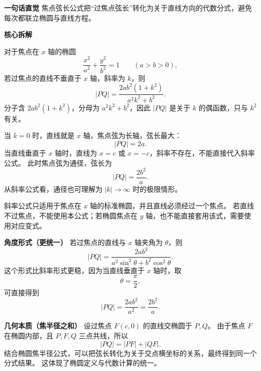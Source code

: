 \begin{explanationbox}
	\textbf{\textcolor{CExplanation}{一句话直觉}}
	焦点弦长公式把“过焦点弦长”转化为关于直线方向的代数分式，避免每次都联立椭圆与直线方程。

	\medskip

	\textbf{\textcolor{CExplanation}{核心拆解}}

	\begin{description}[style=nextline, leftmargin=2.8em, labelsep=0.5em, itemsep=0.45em]
		\item[\textbf{要点一（公式结构）}]
		      对于焦点在 $x$ 轴的椭圆
		      \[
			      \frac{x^2}{a^2}+\frac{y^2}{b^2}=1\qquad (a>b>0),
		      \]
		      若过焦点的直线不垂直于 $x$ 轴，斜率为 $k$，则
		      \[
			      |PQ|=\frac{2ab^2(1+k^2)}{a^2k^2+b^2}.
		      \]
		      分子含 $2ab^2(1+k^2)$，分母为 $a^2k^2+b^2$，因此 $|PQ|$ 是关于 $k$ 的偶函数，只与 $k^2$ 有关。

		\item[\textbf{要点二（水平与垂直）}]
		      当 $k=0$ 时，直线就是 $x$ 轴，焦点弦为长轴，弦长最大：
		      \[
			      |PQ|=2a.
		      \]
		      当直线垂直于 $x$ 轴时，直线为 $x=c$ 或 $x=-c$，斜率不存在，不能直接代入斜率公式。
		      此时焦点弦为通径，弦长为
		      \[
			      |PQ|=\frac{2b^2}{a}.
		      \]
		      从斜率公式看，通径也可理解为 $|k|\to\infty$ 时的极限情形。

		\item[\textbf{要点三（适用范围）}]
		      斜率公式只适用于焦点在 $x$ 轴的标准椭圆，并且直线必须经过一个焦点。
		      若直线不过焦点，不能使用本公式；若椭圆焦点在 $y$ 轴，也不能直接套用该式，需要使用对应变式。
	\end{description}

	\medskip

	\textbf{\textcolor{CExplanation}{角度形式（更统一）}}
	若过焦点的直线与 $x$ 轴夹角为 $\theta$，则
	\[
		|PQ|=\frac{2ab^2}{a^2\sin^2\theta+b^2\cos^2\theta}.
	\]
	这个形式比斜率形式更稳，因为当直线垂直于 $x$ 轴时，取
	\[
		\theta=\frac{\pi}{2},
	\]
	可直接得到
	\[
		|PQ|=\frac{2ab^2}{a^2}=\frac{2b^2}{a}.
	\]

	\medskip

	\textbf{\textcolor{CExplanation}{几何本质（焦半径之和）}}
	设过焦点 $F(c,0)$ 的直线交椭圆于 $P,Q$。
	由于焦点 $F$ 在椭圆内部，且 $P,F,Q$ 三点共线，所以
	\[
		|PQ|=|PF|+|QF|.
	\]
	结合椭圆焦半径公式，可以把弦长转化为关于交点横坐标的关系，最终得到同一个分式结果。
	这体现了椭圆定义与代数计算的统一。

	\medskip


\end{explanationbox}
